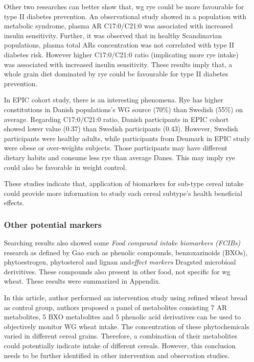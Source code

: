 Other two researches can better show that, \acrshort{wg} rye could be more favourable for type II diabetes prevention.  An observational study showed in a population with metabolic syndrome, plasma AR C17:0/C21:0 was associated with increased insulin sensitivity\cite{ISI:000333777700008}. Further, it was observed that in healthy Scandinavian populations, plasma total ARs concentration was not correlated with type II diabetes risk. However higher C17:0/C21:0 ratio (implicating more rye intake) was associated with increased insulin sensitivity\cite{ISI:000378977200013}. These results imply that, a whole grain diet dominated by rye could be favourable for type II diabetes prevention. 

In EPIC cohort study\cite{ISI:000334172400017}, there is an interesting phenomena. Rye has higher constitutions in Danish populations's WG source (70\%) than Swedish (55\%) on average. Regarding C17:0/C21:0 ratio, Danish participants in EPIC cohort showed lower value (0.37) than Swedish participants (0.43). 
However, Swedish participants were healthy adults, while participants from Denmark in EPIC study were obese or over-weights subjects. Those participants may have different dietary habits and consume less rye than average Danes. This may imply rye could also be favorable in weight control.

These studies indicate that, application of biomarkers for sub-type cereal intake could provide more information to study each cereal subtype's health beneficial effects.

\subsubsection{Other potential markers}
Searching results also showed some \textit{Food compound intake biomarkers (FCIBs)} research as defined by Gao\cite{Gao2017} such as phenolic compounds\cite{ISI:000389134200003}, benzoxazinoids (BXOs)\cite{ISI:000394168100034,ISI:000348343300015}, phytoestrogen\cite{ISI:000384082300001}, phytosterol and lignan\cite{ISI:000387249200001} and\textit{effect markers} Dragsted\cite{Dragsted2017} microbioal derivitives\cite{ISI:000348343300015}. These compounds also present in other food,  not specific for \acrshort{wg} wheat. These results were summarized in Appendix.

In this article\cite{ISI:000387249200001}, author performed an intervention study using refined wheat bread as control group, authors proposed a panel of metabolites consisting 7 AR metabolites, 5 BXO metabolites and 5 phenolic acid derivatives can be used to objectively monitor WG wheat intake. The concentration of these phytochemicals varied in different cereal grains. Therefore, a combination of their metabolites could potentially indicate intake of different cereals. However, this conclusion needs to be further identified in other intervention and observation studies.


